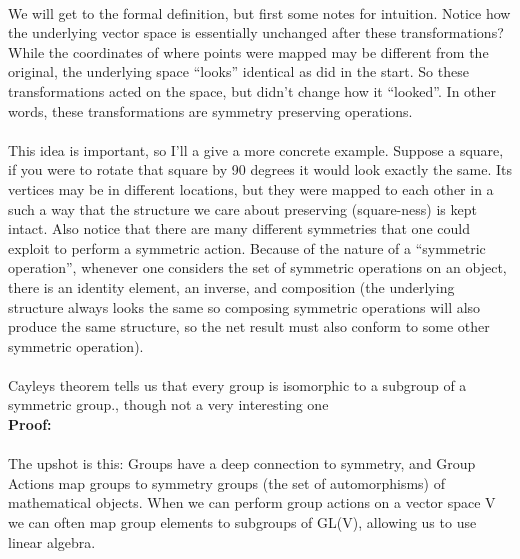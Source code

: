 \documentclass{article}
\begin{document}
\paragraph*{} We will get to the formal definition, but first some notes for
intuition. Notice how the underlying vector space is essentially unchanged after 
these transformations? While the coordinates of where points were mapped may be 
different from the original, the underlying space “looks” identical as did in 
the start. So these transformations acted on the space, but didn't change how it 
“looked”. In other words, these transformations are symmetry preserving operations. 
\paragraph*{} This idea is important, so I'll a give a more concrete example. 
Suppose a square, if you were to rotate that square by 90 degrees it would look 
exactly the same. Its vertices may be in different locations, but they were mapped 
to each other in a such a way that the structure we care about preserving 
(square-ness) is kept intact. Also notice that there are many different symmetries 
that one could exploit to perform a symmetric action. Because of the nature of 
a “symmetric operation”, whenever one considers the set of symmetric operations 
on an object, there is an identity element, an inverse, and composition 
(the underlying structure always looks the same so composing symmetric operations 
will also produce the same structure, so the net result must also conform to some 
other symmetric operation). 
\paragraph*{} Cayleys theorem tells us that every group is isomorphic to a 
subgroup of a symmetric group., though not a very interesting one \\
\textbf{Proof:}
\paragraph*{} The upshot is this: Groups have a deep connection to symmetry, 
and Group Actions map groups to symmetry groups (the set of automorphisms) of 
mathematical objects. When we can perform group actions on a vector space V we 
can often map group elements to subgroups of GL(V), allowing us to use linear 
algebra.
\end{document}
